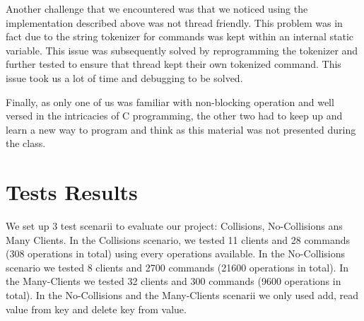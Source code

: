 \documentclass[a4paper,11pt]{report}
\begin{document}
    Another challenge that we encountered was that we noticed using the implementation described above was not
    thread friendly.
    This problem was in fact due to the string tokenizer for commands was kept within an internal static variable. This
    issue was subsequently solved by reprogramming the tokenizer and further tested to ensure that thread kept their own
    tokenized command. This issue took us a lot of time and debugging to be solved.

    Finally, as only one of us was familiar with non-blocking operation and well versed in the intricacies of C programming,
    the other two had to keep up and learn a new way to program and think as this material was not presented
    during the class.

    \section*{Tests Results}
    We set up 3 test scenarii to evaluate our project: Collisions, No-Collisions ans Many Clients. In the Collisions scenario,
    we tested  11 clients and 28 commands (308 operations in total) using every operations available. In the No-Collisions
    scenario we tested 8 clients and 2700 commands (21600 operations in total). In the Many-Clients we tested 32 clients
    and 300 commands (9600 operations in total). In the No-Collisions and the Many-Clients scenarii we only used add, read
    value from key and delete key from value.
\end{document}
